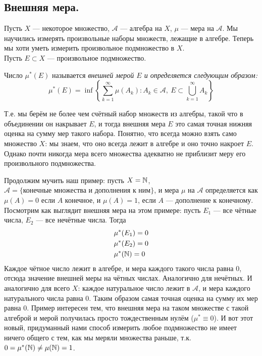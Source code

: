 \subsection{Внешняя мера.}
Пусть $X$ --- некоторое множество, $\mathcal{A}$ --- алгебра на $X$, $\mu$ --- мера на $\mathcal{A}$.
Мы научились измерять произвольные наборы множеств, лежащие в алгебре. Теперь мы хоти уметь измерить произвольное
подмножество в $X$.\\
Пусть $E \subset X$ --- произвольное подмножество.
\begin{definition}
    Число $\mu^*(E)$ называется \it{внешней мерой $E$} и определяется следующим образом:
    \[
        \mu^*(E) = \inf\left\{ \sum\limits_{k = 1}^{\infty} \mu(A_k) \colon A_k \in \mathcal{A}, ~
        E \subset \bigcup_{k = 1}^{\infty} A_k\right\}
    \]
\end{definition}
Т.е. мы берём не более чем счётный набор множеств из алгебры, такой что в объединении он накрывает $E$, и тогда внешняя мера
$E$ это самая точная нижняя оценка на сумму мер такого набора. Понятно, что всегда можно взять само множество $X$: мы знаем, что
оно всегда лежит в алгебре и оно точно накроет $E$. Однако почти никогда мера всего множества адекватно не приблизит меру его произвольного
подмножества.
\begin{comment}
    Вообще говоря \textbf{внешняя мера не является мерой}.
\end{comment}
\begin{example}
    Продолжим мучить наш пример:
    пусть $X = \mathbb{N}$, $\mathcal{A} = \{\text{конечные множества и дополнения к ним}\}$, и мера $\mu$ на $\mathcal{A}$
    определяется как $\mu(A) = 0$ если $A$ конечное, и $\mu(A) = 1$, если $A$ --- дополнение к конечному. Посмотрим как
    выглядит внешняя мера на этом примере: пусть $E_1$ --- все чётные числа, $E_2$ --- все нечётные числа. Тогда
    \begin{align*}
        &\mu^*(E_1) = 0\\
        &\mu^*(E_2) = 0\\
        &\mu^*(\mathbb{N}) = 0
    \end{align*}
    Каждое чётное число лежит в алгебре, и мера каждого такого числа равна $0$, отсюда значение внешней меры на чётных числах.
    Аналогично для нечётных. И аналогично для всего $X$: каждое натуральное число лежит в $\mathcal{A}$, и мера каждого
    натурального числа равна $0$. Таким образом самая точная оценка на сумму их мер равна $0$. Пример интересен тем, что
    внешняя мера на таком множестве с такой алгеброй и мерой получилась просто тождественным нулём ($\mu^* \equiv 0$).
    И вот этот новый, придуманный нами способ измерить любое подмножество не имеет ничего общего с тем, как мы меряли множества
    раньше, т.к. $0 = \mu^*(\mathbb{N}) \neq \mu(\mathbb{N}) = 1$.
\end{example}
